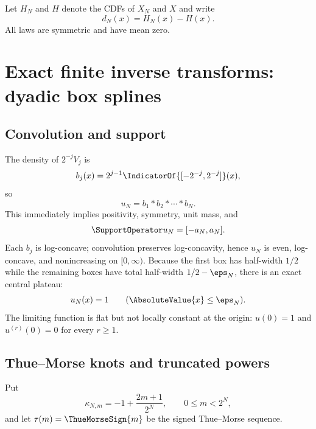 \documentclass[11pt,oneside]{article}
\numberwithin{equation}{section}
\theoremstyle{definition}
\theoremstyle{remark}
\begin{document}
Let $H_N$ and $H$ denote the CDFs of $X_N$ and $X$ and write
\begin{equation}
 d_N(x)=H_N(x)-H(x).
 \label{p5:eq:dN}
\end{equation}
All laws are symmetric and have mean zero.

\section{Exact finite inverse transforms: dyadic box splines}
\label{p5:sec:splines}

\subsection{Convolution and support}

The density of $2^{-j}V_j$ is
\begin{equation}
 b_j(x)=2^{j-1}\IndicatorOf{[-2^{-j},2^{-j}]}(x),
 \label{p5:eq:boxes}
\end{equation}
so
\begin{equation}
 u_N=b_1*b_2*\cdots*b_N.
 \label{p5:eq:convolution}
\end{equation}
This immediately implies positivity, symmetry, unit mass, and
\begin{equation}
 \SupportOperator u_N=[-a_N,a_N].
 \label{p5:eq:support}
\end{equation}
Each $b_j$ is log-concave; convolution preserves log-concavity, hence $u_N$ is even, log-concave, and nonincreasing on $[0,\infty)$.  Because the first box has half-width $1/2$ while the remaining boxes have total half-width $1/2-\eps_N$, there is an exact central plateau:
\begin{equation}
 u_N(x)=1\qquad (\AbsoluteValue{x}\le\eps_N).
 \label{p5:eq:plateau}
\end{equation}
The limiting function is flat but not locally constant at the origin: $u(0)=1$ and $u^{(r)}(0)=0$ for every $r\ge1$.

\subsection{Thue--Morse knots and truncated powers}

Put
\begin{equation}
 \kappa_{N,m}=-1+\frac{2m+1}{2^N},
 \qquad 0\le m<2^N,
 \label{p5:eq:knots}
\end{equation}
and let $\tau(m)=\ThueMorseSign{m}$ be the signed Thue--Morse sequence.
\end{document}
